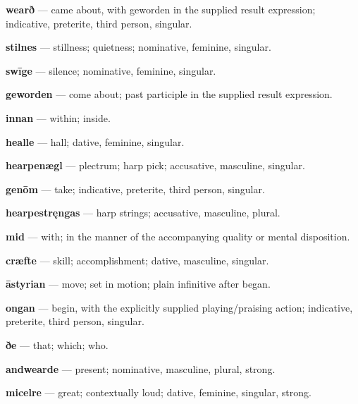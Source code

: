 \textbf{wearð} — came about, with geworden in the supplied result expression; indicative, preterite, third person, singular.

\textbf{stilnes} — stillness; quietness; nominative, feminine, singular.

\textbf{swīge} — silence; nominative, feminine, singular.

\textbf{geworden} — come about; past participle in the supplied result expression.

\textbf{innan} — within; inside.

\textbf{healle} — hall; dative, feminine, singular.

\textbf{hearpenægl} — plectrum; harp pick; accusative, masculine, singular.

\textbf{genōm} — take; indicative, preterite, third person, singular.

\textbf{hearpestręngas} — harp strings; accusative, masculine, plural.

\textbf{mid} — with; in the manner of the accompanying quality or mental disposition.

\textbf{cræfte} — skill; accomplishment; dative, masculine, singular.

\textbf{āstyrian} — move; set in motion; plain infinitive after began.

\textbf{ongan} — begin, with the explicitly supplied playing/\allowbreak{}praising action; indicative, preterite, third person, singular.

\textbf{ðe} — that; which; who.

\textbf{andwearde} — present; nominative, masculine, plural, strong.

\textbf{micelre} — great; contextually loud; dative, feminine, singular, strong.

